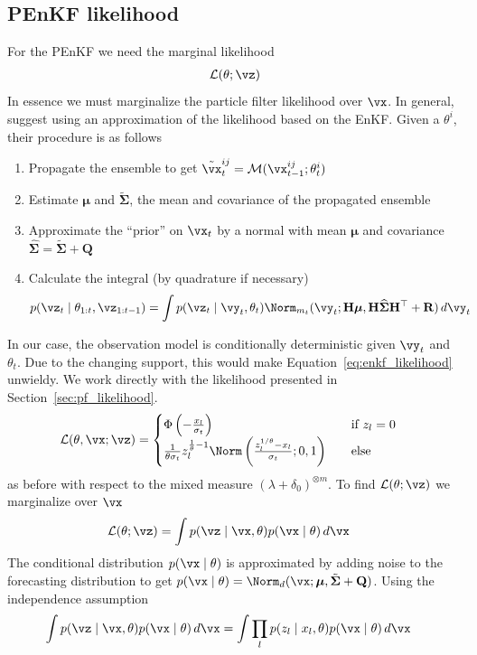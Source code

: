 \documentclass[12pt]{article}
\begin{document}
\subsection{PEnKF likelihood}\label{sec:penkf_likelihood}
For the PEnKF we need the marginal likelihood
\begin{align}
    \mathcal L(\theta; \vz)
\end{align}
In essence we must marginalize the particle filter likelihood over $\vx$. In
general, \cite{katzfuss2020} suggest using an approximation of the likelihood
based on the EnKF. Given a $\theta^i$, their procedure is as follows
\begin{enumerate}
    \item Propagate the ensemble to get $\tilde\vx_t^{ij} = \mathcal M(\vx_{t-1}^{ij};\theta^i_t)$
    \item Estimate $\boldsymbol\mu$ and $\tilde{\mathbf\Sigma}$, the mean and covariance of the propagated
    ensemble
    \item Approximate the ``prior'' on $\vx_t$ by a normal with mean $\boldsymbol\mu$ and
    covariance $\widehat{\mathbf\Sigma} = \tilde{\mathbf\Sigma} + \mathbf Q$ 
    \item Calculate the integral (by quadrature if necessary)
    \begin{align}
        p(\vz_t \mid \theta_{1:t}, \vz_{1:t-1}) &=
            \int p(\vz_t \mid \vy_t, \theta_t)\Norm_{m_t}(\vy_t;\mathbf H\boldsymbol\mu,\mathbf H\widehat{\mathbf\Sigma}\mathbf H^\top + \mathbf R)\,d\vy_t \label{eq:enkf_likelihood}
    \end{align}
\end{enumerate}
In our case, the observation model is conditionally deterministic given
$\vy_t$ and $\theta_t$. Due to the changing support, this would make
Equation~\eqref{eq:enkf_likelihood} unwieldy. We work directly with the
likelihood presented in Section~\ref{sec:pf_likelihood}.
\begin{align}
    \mathcal L(\theta, \vx; \vz) &=
        \begin{cases}
            \Phi\left(-\frac{x_l}{\sigma_t}\right)\quad &\text{if } z_l = 0 \\
            \frac{1}{\theta\sigma_t}z_l^{\frac 1 \theta - 1}\Norm\left(\frac{z_l^{1/\theta}-x_l}{\sigma_t}; 0, 1\right)\quad &\text{else}
        \end{cases}
\end{align}
as before with respect to the mixed measure $(\lambda + \delta_0)^{\otimes m}$.
To find $\mathcal L(\theta; \vz)$ we marginalize over $\vx$
\begin{align}
   \mathcal L(\theta; \vz) &= \int p(\vz \mid \vx,\theta)p(\vx \mid \theta)\,d\vx
\end{align}
The conditional distribution $p(\vx \mid \theta)$ is approximated by adding noise to
the forecasting distribution to get $p(\vx \mid \theta) = \Norm_d(\vx; \boldsymbol\mu, \tilde{\mathbf\Sigma} + \mathbf Q)$. Using the independence assumption
\begin{align}
    \int p(\vz \mid \vx,\theta)p(\vx \mid \theta)\,d\vx 
    &= \int \prod_l p(z_l \mid x_l, \theta)p(\vx \mid \theta)\,d\vx \label{eq:penkf_integral}
\end{align}
\end{document}
